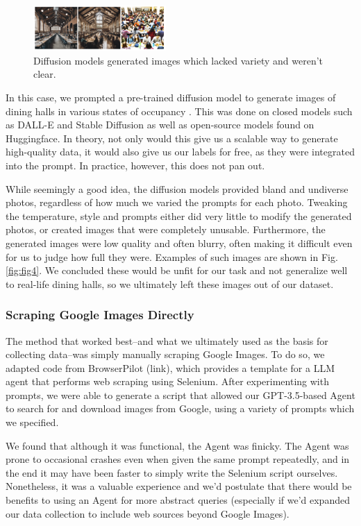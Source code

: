 \documentclass{article}
\begin{document}
\begin{multicols}{2}
\begin{figure}[H]
  \centering
  \includegraphics[width=0.45\textwidth]{diffusionImages.png}
  \caption{Diffusion models generated images which lacked variety and weren’t clear.}
  \label{fig:fig3}
\end{figure}

In this case, we prompted a pre-trained diffusion model to generate images of dining halls in various states of occupancy \cite{rombachHighResolutionImageSynthesis2022}. This was done on closed models such as DALL-E and Stable Diffusion as well as open-source models found on Huggingface. In theory, not only would this give us a scalable way to generate high-quality data, it would also give us our labels for free, as they were integrated into the prompt. In practice, however, this does not pan out.

While seemingly a good idea, the diffusion models provided bland and undiverse photos, regardless of how much we varied the prompts for each photo. Tweaking the temperature, style and prompts either did very little to modify the generated photos, or created images that were completely unusable. Furthermore, the generated images were low quality and often blurry, often making it difficult even for us to judge how full they were. Examples of such images are shown in Fig. \ref{fig:fig4}. We concluded these would be unfit for our task and not generalize well to real-life dining halls, so we ultimately left these images out of our dataset.

\subsubsection*{Scraping Google Images Directly}
The method that worked best–and what we ultimately used as the basis for collecting data–was simply manually scraping Google Images. To do so, we adapted code from BrowserPilot (link), which provides a template for a LLM agent that performs web scraping using Selenium. After experimenting with prompts, we were able to generate a script that allowed our GPT-3.5-based Agent to search for and download images from Google, using a variety of prompts which we specified.

We found that although it was functional, the Agent was finicky. The Agent was prone to occasional crashes even when given the same prompt repeatedly, and in the end it may have been faster to simply write the Selenium script ourselves. Nonetheless, it was a valuable experience and we'd postulate that there would be benefits to using an Agent for more abstract queries (especially if we’d expanded our data collection to include web sources beyond Google Images).


\end{multicols}
\end{document}
